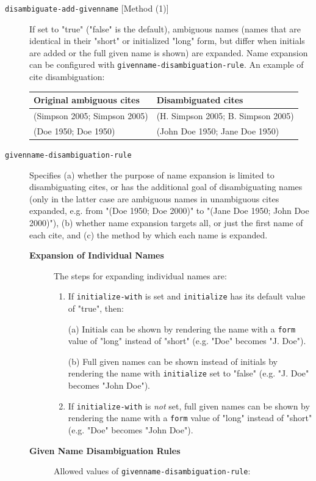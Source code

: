 \begin{description}
\item[\texttt{disambiguate-add-givenname} {[}Method (1){]}]
If set to "true" ("false" is the default), ambiguous names (names that
are identical in their "short" or initialized "long" form, but differ
when initials are added or the full given name is shown) are expanded.
Name expansion can be configured with
\texttt{givenname-disambiguation-rule}. An example of cite
disambiguation:

\begin{longtable}[]{@{}ll@{}}
\toprule\noalign{}
Original ambiguous cites & Disambiguated cites \\
\midrule\noalign{}
\endhead
\bottomrule\noalign{}
\endlastfoot
(Simpson 2005; Simpson 2005) & (H. Simpson 2005; B. Simpson 2005) \\
(Doe 1950; Doe 1950) & (John Doe 1950; Jane Doe 1950) \\
\end{longtable}
\item[\texttt{givenname-disambiguation-rule}]
Specifies (a) whether the purpose of name expansion is limited to
disambiguating cites, or has the additional goal of disambiguating names
(only in the latter case are ambiguous names in unambiguous cites
expanded, e.g. from "(Doe 1950; Doe 2000)" to "(Jane Doe 1950; John Doe
2000)"), (b) whether name expansion targets all, or just the first name
of each cite, and (c) the method by which each name is expanded.

\begin{description}
\item[\textbf{Expansion of Individual Names}]
The steps for expanding individual names are:

\begin{enumerate}
\def\labelenumi{\arabic{enumi}.}
\item
  If \texttt{initialize-with} is set and \texttt{initialize} has its
  default value of "true", then:

  (a) Initials can be shown by rendering the name with a \texttt{form}
  value of "long" instead of "short" (e.g. "Doe" becomes "J. Doe").

  (b) Full given names can be shown instead of initials by rendering the
  name with \texttt{initialize} set to "false" (e.g. "J. Doe" becomes
  "John Doe").
\item
  If \texttt{initialize-with} is \emph{not} set, full given names can be
  shown by rendering the name with a \texttt{form} value of "long"
  instead of "short" (e.g. "Doe" becomes "John Doe").
\end{enumerate}
\item[\textbf{Given Name Disambiguation Rules}]
Allowed values of \texttt{givenname-disambiguation-rule}:


\end{description}
\end{description}
